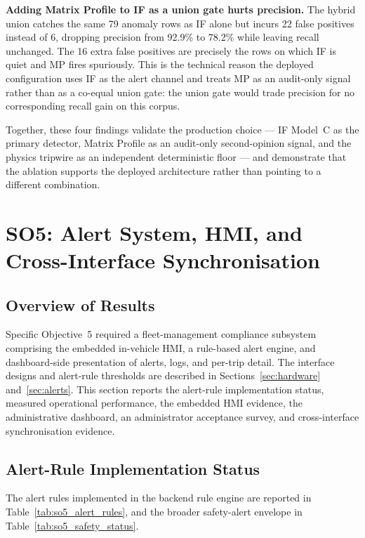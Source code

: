 \textbf{Adding Matrix Profile to IF as a union gate hurts precision.} The hybrid union catches the same 79 anomaly rows as IF alone but incurs 22 false positives instead of 6, dropping precision from 92.9\% to 78.2\% while leaving recall unchanged. The 16 extra false positives are precisely the rows on which IF is quiet and MP fires spuriously. This is the technical reason the deployed configuration uses IF as the alert channel and treats MP as an audit-only signal rather than as a co-equal union gate: the union gate would trade precision for no corresponding recall gain on this corpus.

Together, these four findings validate the production choice --- IF Model~C as the primary detector, Matrix Profile as an audit-only second-opinion signal, and the physics tripwire as an independent deterministic floor --- and demonstrate that the ablation supports the deployed architecture rather than pointing to a different combination.
\fi   %


\section{SO5: Alert System, HMI, and Cross-Interface Synchronisation}
\label{sec:results_so5}

\subsection{Overview of Results}
Specific Objective~5 required a fleet-management compliance subsystem comprising the embedded in-vehicle HMI, a rule-based alert engine, and dashboard-side presentation of alerts, logs, and per-trip detail. The interface designs and alert-rule thresholds are described in Sections~\ref{sec:hardware} and~\ref{sec:alerts}. This section reports the alert-rule implementation status, measured operational performance, the embedded HMI evidence, the administrative dashboard, an administrator acceptance survey, and cross-interface synchronisation evidence.

\subsection{Alert-Rule Implementation Status}
The alert rules implemented in the backend rule engine are reported in Table~\ref{tab:so5_alert_rules}, and the broader safety-alert envelope in Table~\ref{tab:so5_safety_status}.

